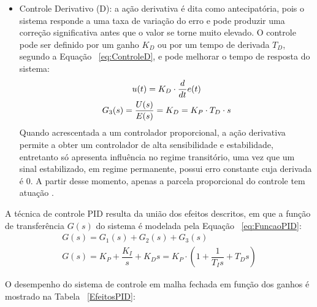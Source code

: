 \begin{itemize}
    \item Controle Derivativo (D): a ação derivativa é dita como antecipatória, pois o sistema responde a uma taxa de variação do erro e pode produzir uma correção significativa antes que o valor se torne muito elevado. O controle pode ser definido por um ganho $K_D$ ou por um tempo de derivada $T_D$, segundo a Equação ~\ref{eq:ControleD}, e pode melhorar o tempo de resposta do sistema: 
    \begin{equation}
        \label{eq:ControleD}
        \centering
        \begin{gathered}
            u(t) = K_D \cdot \dfrac{d}{dt}e(t) \\
            G_3(s) = \dfrac{U(s)}{E(s)} = K_D = K_P \cdot T_D \cdot s
        \end{gathered}
    \end{equation}
    Quando acrescentada a um controlador proporcional, a ação derivativa permite a obter um controlador de alta sensibilidade e estabilidade, entretanto só apresenta influência no regime  transitório, uma vez que um sinal estabilizado, em regime permanente, possui erro constante cuja derivada é $0$. A partir desse momento, apenas a parcela proporcional do controle tem atuação \cite{TCC_Controle1}.
\end{itemize}

A técnica de controle PID resulta da união dos efeitos descritos, em que a função de transferência $G(s)$ do sistema é modelada pela Equação ~\ref{eq:FuncaoPID}:
\begin{equation}
    \begin{gathered}
        \label{eq:FuncaoPID}
        G(s) = G_1(s) + G_2(s) + G_3(s) \\
        G(s) = K_P + \dfrac{K_I}{s} + K_D s = K_P \cdot \left (1 + \dfrac{1}{T_I s} + T_D s\right) 
    \end{gathered}
\end{equation}

O desempenho do sistema de controle em malha fechada em função dos ganhos é mostrado na Tabela ~\ref{EfeitosPID}:
    
